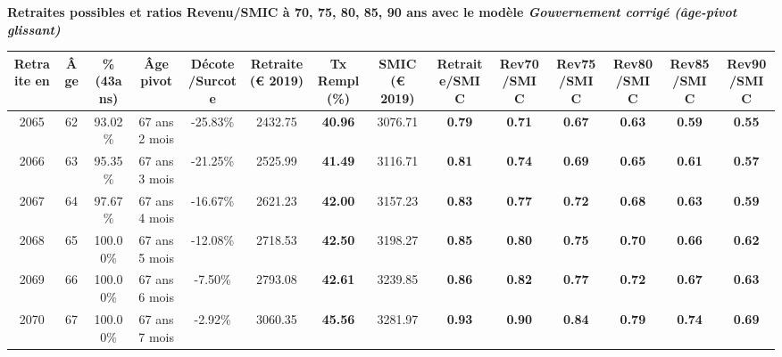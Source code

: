  \vspace{0.1cm} 
{\bf \noindent Retraites possibles et ratios Revenu/SMIC à 70, 75, 80, 85, 90 ans avec le modèle \emph{Gouvernement corrigé (âge-pivot glissant)}}  
 
\begin{adjustbox}{max width=\textwidth} 
\begin{tabular}[htb]{|c|c||c|c|c||c|c||c||c|c|c|c|c|c|} 
\hline 
 Retraite en &  Âge &  \%(43ans) &  Âge pivot &  Décote/Surcote &  Retraite (\euro{} 2019) &  Tx Rempl(\%) &  SMIC (\euro{} 2019) &  Retraite/SMIC &  Rev70/SMIC &  Rev75/SMIC &  Rev80/SMIC &  Rev85/SMIC &  Rev90/SMIC \\ 
\hline \hline 
 2065 &  62 &  93.02\% &  67 ans 2 mois &  -25.83\% &  2432.75 &  {\bf 40.96} &  3076.71 &  {\bf {\color{red} 0.79}} &  {\bf {\color{red} 0.71}} &  {\bf {\color{red} 0.67}} &  {\bf {\color{red} 0.63}} &  {\bf {\color{red} 0.59}} &  {\bf {\color{red} 0.55}} \\ 
\hline 
 2066 &  63 &  95.35\% &  67 ans 3 mois &  -21.25\% &  2525.99 &  {\bf 41.49} &  3116.71 &  {\bf {\color{red} 0.81}} &  {\bf {\color{red} 0.74}} &  {\bf {\color{red} 0.69}} &  {\bf {\color{red} 0.65}} &  {\bf {\color{red} 0.61}} &  {\bf {\color{red} 0.57}} \\ 
\hline 
 2067 &  64 &  97.67\% &  67 ans 4 mois &  -16.67\% &  2621.23 &  {\bf 42.00} &  3157.23 &  {\bf {\color{red} 0.83}} &  {\bf {\color{red} 0.77}} &  {\bf {\color{red} 0.72}} &  {\bf {\color{red} 0.68}} &  {\bf {\color{red} 0.63}} &  {\bf {\color{red} 0.59}} \\ 
\hline 
 2068 &  65 &  100.00\% &  67 ans 5 mois &  -12.08\% &  2718.53 &  {\bf 42.50} &  3198.27 &  {\bf {\color{red} 0.85}} &  {\bf {\color{red} 0.80}} &  {\bf {\color{red} 0.75}} &  {\bf {\color{red} 0.70}} &  {\bf {\color{red} 0.66}} &  {\bf {\color{red} 0.62}} \\ 
\hline 
 2069 &  66 &  100.00\% &  67 ans 6 mois &  -7.50\% &  2793.08 &  {\bf 42.61} &  3239.85 &  {\bf {\color{red} 0.86}} &  {\bf {\color{red} 0.82}} &  {\bf {\color{red} 0.77}} &  {\bf {\color{red} 0.72}} &  {\bf {\color{red} 0.67}} &  {\bf {\color{red} 0.63}} \\ 
\hline 
 2070 &  67 &  100.00\% &  67 ans 7 mois &  -2.92\% &  3060.35 &  {\bf 45.56} &  3281.97 &  {\bf {\color{red} 0.93}} &  {\bf {\color{red} 0.90}} &  {\bf {\color{red} 0.84}} &  {\bf {\color{red} 0.79}} &  {\bf {\color{red} 0.74}} &  {\bf {\color{red} 0.69}} \\ 
\hline 
\hline 
\end{tabular} 
\end{adjustbox} 
 
